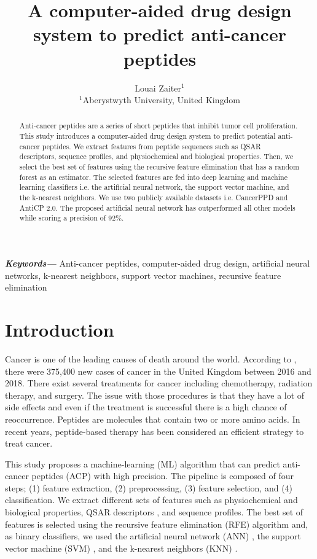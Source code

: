 \documentclass[twocolumn]{article}
\title{A computer-aided drug design system to predict anti-cancer peptides}
\author{Louai Zaiter$^{1}$ \\
        \small $^{1}$Aberystwyth University, United Kingdom\\}
\date{} %
\providecommand{\keywords}[1]
{
  \small	
  \textbf{\textit{Keywords---}} #1
}
\begin{document}
\maketitle

\begin{abstract}
 Anti-cancer peptides are a series of short peptides that inhibit tumor cell proliferation. This study introduces a computer-aided drug design system to predict potential anti-cancer peptides. We extract features from peptide sequences such as QSAR descriptors, sequence profiles, and physiochemical and biological properties. Then, we select the best set of features using the recursive feature elimination that has a random forest as an estimator. The selected features are fed into deep learning and machine learning classifiers i.e. the artificial neural network, the support vector machine, and the k-nearest neighbors. We use two publicly available datasets i.e. CancerPPD and AntiCP 2.0. The proposed artificial neural network has outperformed all other models while scoring a precision of 92\%.
\end{abstract} \hspace{10pt}

\keywords{Anti-cancer peptides, computer-aided drug design, artificial neural networks, k-nearest neighbors, support vector machines, recursive feature elimination}
\section{Introduction}
Cancer is one of the leading causes of death around the world. According to \cite{key}, there were 375,400 new cases of cancer in the United Kingdom between 2016 and 2018. There exist several treatments for cancer including chemotherapy, radiation therapy, and surgery. The issue with those procedures is that they have a lot of side effects and even if the treatment is successful there is a high chance of reoccurrence. Peptides are molecules that contain two or more amino acids. In recent years, peptide-based therapy has been considered an efficient strategy to treat cancer.

This study proposes a machine-learning (ML) algorithm that can predict anti-cancer peptides (ACP) with high precision. The pipeline is composed of four steps; (1) feature extraction, (2) preprocessing, (3) feature selection, and (4) classification. We extract different sets of features such as physiochemical and biological properties, QSAR descriptors \cite{khan2016descriptors}, and sequence profiles. The best set of features is selected using the recursive feature elimination (RFE) \cite{chen2007enhanced} algorithm and, as binary classifiers, we used the artificial neural network (ANN) \cite{basheer2000artificial}, the support vector machine (SVM) \cite{hearst1998support}, and the k-nearest neighbors (KNN) \cite{peterson2009k}.
\end{document}
